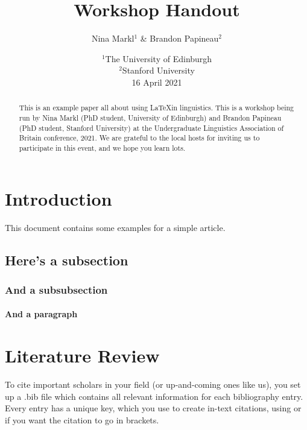 \documentclass[a4paper, 12pt]{article} %
\title{Workshop Handout} %
\author{Nina Markl$^1$ \& Brandon Papineau$^2$} %
\date{%
    $^1$The University of Edinburgh\\%
    $^2$Stanford University\\[2.5ex]
16 April 2021} %
\begin{document}

\maketitle %
\tableofcontents %
\pagebreak %


\begin{abstract} %
    This is an example paper all about using \LaTeX in linguistics. This is a workshop being run by Nina Markl (PhD student, University of Edinburgh) and Brandon Papineau (PhD student, Stanford University) at the Undergraduate Linguistics Association of Britain conference, 2021. We are grateful to the local hosts for inviting us to participate in this event, and we hope you learn lots.
\end{abstract}

\section{Introduction} %

This document contains some examples for a simple article.

\subsection{Here's a subsection}

\subsubsection{And a subsubsection}

\paragraph{And a paragraph}

\section{Literature Review}

To cite important scholars in your field (or up-and-coming ones like us), you set up a .bib file which contains all relevant information for each bibliography entry. Every entry has a unique key, which you use to create in-text citations, using \textcite[15]{papineauhooked} or \parencite[27]{burchell-etal-2020-querent} if you want the citation to go in brackets.
\end{document}

